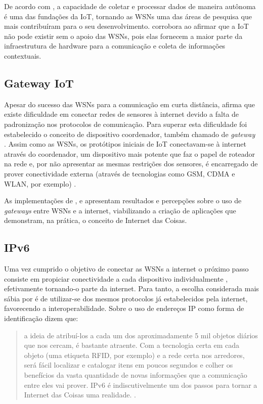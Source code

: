 \documentclass[twoside,english,brazilian]{UNISINOSmonografia}
\begin{document}
	De acordo com , a capacidade de coletar e processar 
	dados de maneira autônoma é uma das fundações da IoT, tornando as WSNs uma 
	das áreas de pesquisa que mais contribuíram para o seu desenvolvimento. 
	 corrobora ao afirmar que a IoT não pode existir sem 
	o apoio das WSNs, pois elas fornecem a maior parte da infraestrutura de 
	hardware para a comunicação e coleta de informações contextuais.

\subsection{Gateway IoT}
	Apesar do sucesso das WSNs para a comunicação em curta distância, 
	 afirma que existe dificuldade 
	em conectar redes de sensores à internet devido a falta de padronização 
	nos protocolos de comunicação. Para superar esta dificuldade foi 
	estabelecido o conceito de dispositivo coordenador, também chamado de 
	\textit{gateway} \cite{Steenkamp2009}. 
	Assim como as WSNs, os protótipos iniciais de IoT conectavam-se à internet 
	através do coordenador, um dispositivo mais potente que faz o papel de 
	roteador na rede \cite{Kuryla2010} e, por não apresentar as mesmas 
	restrições dos sensores, é encarregado de prover 
	conectividade externa (através de 
	tecnologias como GSM, CDMA e WLAN, por exemplo) \cite{Liu2012}.
	
	As implementações de ,  e 
	 apresentam resultados e percepções sobre o uso de 
	\textit{gateways} entre WSNs e a internet, viabilizando a criação de 
	aplicações que demonstram, na prática, o conceito de Internet das Coisas.

\subsection{IPv6}
	Uma vez cumprido o objetivo de conectar as WSNs a internet o próximo passo 
	consiste em propiciar conectividade a cada dispositivo individualmente 
	\cite[p.~13]{Atzori2010b}, efetivamente tornando-o parte da internet.
	Para tanto, a escolha considerada mais sábia por  
	é de utilizar-se dos mesmos protocolos já estabelecidos pela internet, 
	favorecendo a interoperabilidade.
	Sobre o uso de endereços IP como forma de 
	identificação  dizem que:
	\begin{quote}
		a ideia de atribuí-los a cada um dos aproximadamente 5 
		mil objetos diários que nos cercam, é bastante atraente.
		Com a tecnologia certa em cada objeto (uma etiqueta RFID, por exemplo) 
		e a rede certa nos arredores, será fácil localizar e catalogar itens 
		em poucos segundos e colher os benefícios da vasta quantidade de novas 
		informações que a comunicação entre eles vai prover. IPv6 é 
		indiscutivelmente um dos passos para tornar a Internet das Coisas uma 
		realidade.
		\cite[p.~15]{Sundmaeker2010}.
	\end{quote}
	
\end{document}
